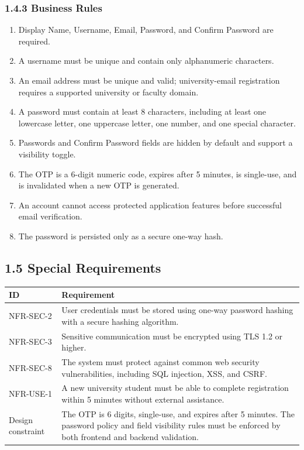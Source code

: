 \documentclass[12pt]{article}
\renewcommand{\baselinestretch}{1.5}
\begin{document}
\subsubsection*{1.4.3 Business Rules}
\par\medskip
\begin{enumerate}
\item Display Name, Username, Email, Password, and Confirm Password are required.
\item A username must be unique and contain only alphanumeric characters.
\item An email address must be unique and valid; university-email registration requires a supported university or faculty domain.
\item A password must contain at least 8 characters, including at least one lowercase letter, one uppercase letter, one number, and one special character.
\item Passwords and Confirm Password fields are hidden by default and support a visibility toggle.
\item The OTP is a 6-digit numeric code, expires after 5 minutes, is single-use, and is invalidated when a new OTP is generated.
\item An account cannot access protected application features before successful email verification.
\item The password is persisted only as a secure one-way hash.
\end{enumerate}
\par\medskip
\hypertarget{sec:1-5-special-requirements}{}
\subsection*{1.5 Special Requirements}
\par\medskip
\begingroup
\small
\renewcommand{\baselinestretch}{1.0}\selectfont
\renewcommand{\arraystretch}{1.15}
\setlength{\tabcolsep}{6pt}
\begin{longtable}{|>{\raggedright\arraybackslash}p{}|>{\raggedright\arraybackslash}p{}|}
\hline
\textbf{ID} & \textbf{Requirement} \\ \hline
\endhead
NFR-SEC-2 & User credentials must be stored using one-way password hashing with a secure hashing algorithm. \\ \hline
NFR-SEC-3 & Sensitive communication must be encrypted using TLS 1.2 or higher. \\ \hline
NFR-SEC-8 & The system must protect against common web security vulnerabilities, including SQL injection, XSS, and CSRF. \\ \hline
NFR-USE-1 & A new university student must be able to complete registration within 5 minutes without external assistance. \\ \hline
Design constraint & The OTP is 6 digits, single-use, and expires after 5 minutes. The password policy and field visibility rules must be enforced by both frontend and backend validation. \\ \hline
\end{longtable}
\endgroup
\par\medskip
\hypertarget{sec:1-6-preconditions}{}
\end{document}
